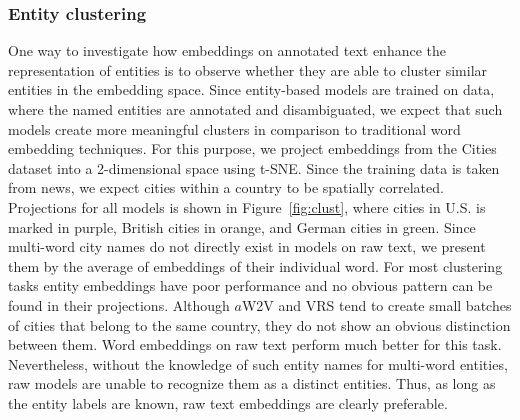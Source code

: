 \subsubsection{Entity clustering} 
One way to investigate how embeddings on annotated text enhance the representation of entities is to observe whether they are able to cluster similar entities in the embedding space. Since entity-based models are trained on data, where the named entities are annotated and disambiguated, we expect that such models create more meaningful clusters in comparison to traditional word embedding techniques. For this purpose, we project embeddings from the Cities dataset into a 2-dimensional space using t-SNE. Since the training data is taken from news, we expect cities within a country to be spatially correlated. Projections for all models is shown in Figure~\ref{fig:clust}, where cities in U.S. is marked in purple, British cities in orange, and German cities in green.  Since multi-word city names do not directly exist in models on raw text, we present them by the average of embeddings of their individual word. For most clustering tasks entity embeddings have poor performance and no obvious pattern can be found in their projections. Although $a$W2V and VRS tend to create small batches of cities that belong to the same country, they do not show an obvious distinction between them. Word embeddings on raw text perform much better for this task. Nevertheless, without the knowledge of such entity names for multi-word entities, raw models are unable to recognize them as a distinct entities. Thus, as long as the entity labels are known, raw text embeddings are clearly preferable. 

